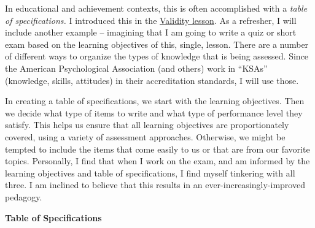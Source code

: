 \documentclass[
  english,
]{book}
\begin{document}
In educational and achievement contexts, this is often accomplished with a \emph{table of specifications.} I introduced this in the \protect\hyperlink{rxy}{Validity lesson}. As a refresher, I will include another example -- imagining that I am going to write a quiz or short exam based on the learning objectives of this, single, lesson. There are a number of different ways to organize the types of knowledge that is being assessed. Since the American Psychological Association (and others) work in ``KSAs'' (knowledge, skills, attitudes) in their accreditation standards, I will use those.

In creating a table of specifications, we start with the learning objectives. Then we decide what type of items to write and what type of performance level they satisfy. This helps us ensure that all learning objectives are proportionately covered, using a variety of assessment approaches. Otherwise, we might be tempted to include the items that come easily to us or that are from our favorite topics. Personally, I find that when I work on the exam, and am informed by the learning objectives and table of specifications, I find myself tinkering with all three. I am inclined to believe that this results in an ever-increasingly-improved pedagogy.

\textbf{Table of Specifications}
\end{document}
